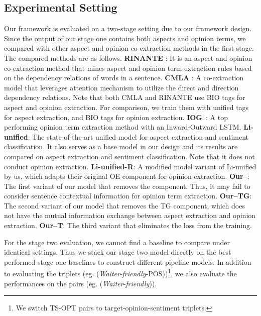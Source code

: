 \documentclass[letterpaper]{article} \usepackage{aaai20}  \usepackage{times}  \usepackage{helvet} \usepackage{courier}  \usepackage[hyphens]{url}  \usepackage{graphicx} \urlstyle{rm} \def\UrlFont{\rm}  \usepackage{graphicx}  \frenchspacing  \setlength{\pdfpagewidth}{8.5in}  \setlength{\pdfpageheight}{11in}
\begin{document}
\begin{table*}[t]
\begin{small}
\end{small}
\end{table*}

\subsection{Experimental Setting}

Our framework is evaluated on a two-stage setting due to our framework design. Since the output of our stage one contains both aspects and opinion terms, we compared with other aspect and opinion co-extraction methods in the first stage. The compared methods are as follows. \textbf{RINANTE} \cite{dai2019neural}: It is an aspect and opinion co-extraction method that mines aspect and opinion term extraction rules based on the dependency relations of words in a sentence. \textbf{CMLA} \cite{wang2017coupled}: A co-extraction model that leverages attention mechanism to utilize the direct and direction dependency relations. Note that both CMLA and RINANTE use BIO tags for aspect and opinion extraction. For comparison, we train them with unified tags for aspect extraction, and BIO tags for opinion extraction. 
     \textbf{IOG}~\cite{fan2019target}: A top performing opinion term extraction method with an Inward-Outward LSTM.
     \textbf{Li-unified}: \cite{li2019unified} The state-of-the-art unified model for aspect extraction and sentiment classification. It also serves as a base model in our design and its results are compared on aspect extraction and sentiment classification. Note that it does not conduct opinion extraction.
     \textbf{Li-unified-R}: A modified model variant of Li-unified by us, which adapts their original OE component for opinion extraction.
     \textbf{Our--}: The first variant of our model that removes the  component. Thus, it may fail to consider sentence contextual information for opinion term extraction.
     \textbf{Our--TG}: The second variant of our model that removes the TG component, which does not have the mutual information exchange between aspect extraction and opinion extraction.
     \textbf{Our--T}: The third variant that eliminates the loss  from the training.



For the stage two evaluation, we cannot find a baseline to compare under identical settings. Thus we stack our stage two model directly on the best performed stage one baselines to construct different pipeline models. In addition to evaluating the triplets (eg. (\textit{Waiter}-\textit{friendly}-POS))\footnote{We switch TS-OPT pairs to target-opinion-sentiment triplets.}, we also evaluate the performances on the pairs (eg. (\textit{Waiter}-\textit{friendly})).
\end{document}
